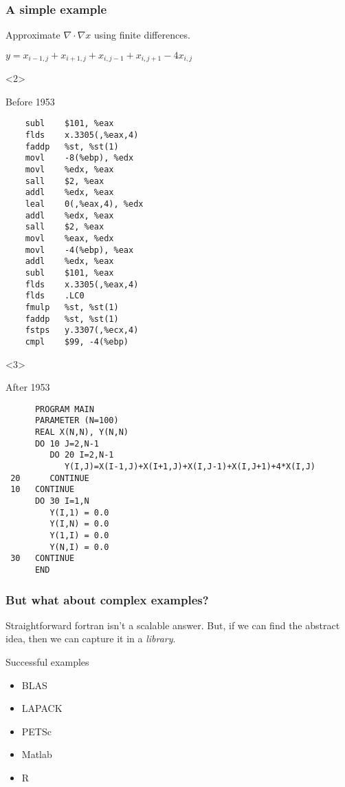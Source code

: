 \documentclass[presentation]{beamer}
\begin{document}
\begin{frame}[fragile]
  \frametitle{A simple example}
  Approximate $\nabla \cdot \nabla x$ using finite differences.

  $y = x_{i-1, j} + x_{i+1, j} + x_{i, j-1} + x_{i, j+1} - 4x_{i,j}$

  \begin{onlyenv}<2>
    \begin{block}{Before 1953}
\begin{verbatim}
	subl	$101, %eax
	flds	x.3305(,%eax,4)
	faddp	%st, %st(1)
	movl	-8(%ebp), %edx
	movl	%edx, %eax
	sall	$2, %eax
	addl	%edx, %eax
	leal	0(,%eax,4), %edx
	addl	%edx, %eax
	sall	$2, %eax
	movl	%eax, %edx
	movl	-4(%ebp), %eax
	addl	%edx, %eax
	subl	$101, %eax
	flds	x.3305(,%eax,4)
	flds	.LC0
	fmulp	%st, %st(1)
	faddp	%st, %st(1)
	fstps	y.3307(,%ecx,4)
	cmpl	$99, -4(%ebp)
\end{verbatim}
    \end{block}
  \end{onlyenv}
  \begin{onlyenv}<3>
    \begin{block}{After 1953}
\begin{verbatim}
      PROGRAM MAIN
      PARAMETER (N=100)
      REAL X(N,N), Y(N,N)
      DO 10 J=2,N-1
         DO 20 I=2,N-1
            Y(I,J)=X(I-1,J)+X(I+1,J)+X(I,J-1)+X(I,J+1)+4*X(I,J)
 20      CONTINUE
 10   CONTINUE
      DO 30 I=1,N
         Y(I,1) = 0.0
         Y(I,N) = 0.0
         Y(1,I) = 0.0
         Y(N,I) = 0.0
 30   CONTINUE
      END
\end{verbatim}
    \end{block}
  \end{onlyenv}
\end{frame}

\begin{frame}
  \frametitle{But what about complex examples?}
  Straightforward fortran isn't a scalable answer.  But, if we can
  find the abstract idea, then we can capture it in a \emph{library}.

  Successful examples

  \begin{itemize}
  \item BLAS
  \item LAPACK
  \item PETSc
  \item Matlab
  \item R
  \end{itemize}
\end{frame}
\end{document}
